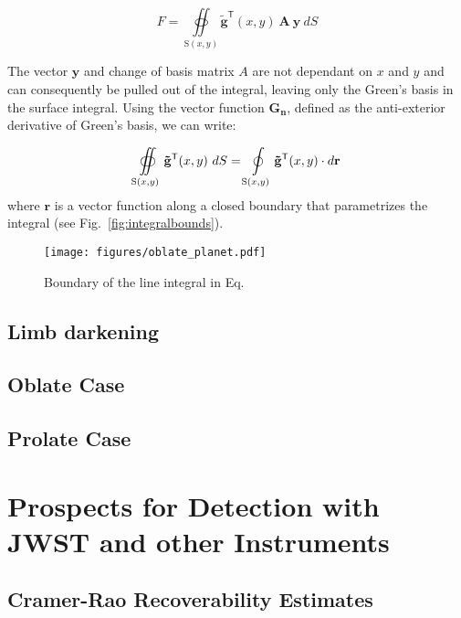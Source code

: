 \documentclass[twocolumn]{aastex631}
\begin{document}
\begin{equation}
   F = \oiint\limits_{\mathrm{S}(x,y)} \mathbf{\tilde{g}}^\mathsf{T}(x,y) \ \mathbf{A} \ \mathbf{y}\ dS 
\end{equation}

The vector $\mathbf{y}$ and change of basis matrix $A$ are not dependant on $x$ and $y$ and can consequently be pulled out of the integral, leaving only the Green's basis in the surface integral. Using the vector function $\mathbf{G_n}$, defined as the anti-exterior derivative of Green's basis, we can write:

\begin{equation}
   \oiint\limits_{\mathrm{S}(x,y)} \mathbf{\tilde{g}}^\mathsf{T}(x,y)\ dS \\
   = \oint\limits_{\mathrm{S}(x,y)} \mathbf{\tilde{g}}^\mathsf{T}(x,y) \cdot d\mathbf{r}
\end{equation}
where $\mathbf{r}$ is a vector function along a closed boundary that parametrizes the integral (see Fig.~\ref{fig:integralbounds}). 

\begin{figure}[ht!]
    \begin{centering}
        \texttt{[image: figures/oblate\_planet.pdf]}
        \caption{Boundary of the line integral in Eq.~
        }
        \label{fig:integral_bounds}
    \end{centering}
\end{figure}

\subsection{Limb darkening}
\subsection{Oblate Case}
\subsection{Prolate Case}
\section{Prospects for Detection with JWST and other Instruments}
\label{sec:jwstdetect}
\subsection{Cramer-Rao Recoverability Estimates}
\label{sec:rec}
\end{document}
